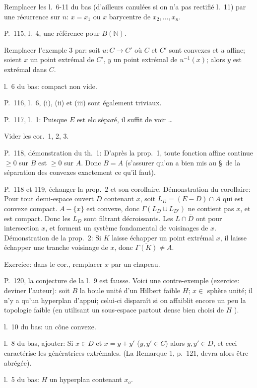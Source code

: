 Remplacer les l.\ 6-11 du bas (d'ailleurs canulées si on n'a pas rectifié l.\ 11) par une récurrence sur $n$: $x=x_1$ ou $x$ barycentre de $x_2,\ldots,x_n$.

P.\ 115, l.\ 4, une référence pour $B(\mathbb{N})$.

Remplacer l'exemple 3 par: soit $u:C\longrightarrow C'$ où $C$ et $C'$ sont convexes et $u$ affine; soient $x$ un point extrémal de $C'$, $y$ un point extrémal de $u^{-1}(x)$; alors $y$ est extrémal dans $C$.

l.\ 6 du bas: compact non vide.

P.\ 116, l.\ 6, (i), (ii) et (iii) sont également triviaux.

P.\ 117, l.\ 1: Puisque $E$ est elc séparé, il suffit de voir \ldots

Vider les cor.\ 1, 2, 3.

P.\ 118, démonstration du th.\ 1: D'après la prop.\ 1, toute fonction affine continue $\geq0$ sur $B$ est $\geq0$ sur $A$. Donc $B=A$ (s'assurer qu'on a bien mis au \S\ de la séparation des convexes exactement ce qu'il faut).

P.\ 118 et 119, échanger la prop.\ 2 et son corollaire. Démonstration du corollaire: Pour tout demi-espace ouvert $D$ contenant $x$, soit $L_D=(E-D)\cap A$ qui est convexe compact. $A-\{x\}$ est convexe, donc $\Gamma(L_D\cup L_{D'})$ ne contient pas $x$, et est compact. Donc les $L_D$ sont filtrant décroissants. Les $L\cap\bar D$ ont pour intersection $x$, et forment un système fondamental de voisinages de $x$. Démonstration de la prop.\ 2: Si $K$ laisse échapper un point extrémal $x$, il laisse échapper une tranche voisinage de $x$, donc $\overline{\Gamma(K)}\neq A$.

Exercice: dans le cor., remplacer $x$ par un chapeau.

P.\ 120, la conjecture de la l.\ 9 est fausse. Voici une contre-exemple (exercice: deviner l'auteur): soit $B$ la boule unité d'un Hilbert faible $H$; $x\in$ sphère unité; il n'y a qu'un hyperplan d'appui; celui-ci disparaît si on affaiblit encore un peu la topologie faible (en utilisant un sous-espace partout dense bien choisi de $H$ ).

l.\ 10 du bas: un cône convexe.

l.\ 8 du bas, ajouter: Si $x\in D$ et $x=y+y'$ ($y,y'\in C$) alors $y,y'\in D$, et ceci caractérise les génératrices extrémales. (La Remarque 1, p.\ 121, devra alors être abrégée).

l.\ 5 du bas: $H$ un hyperplan contenant $x_o$.

